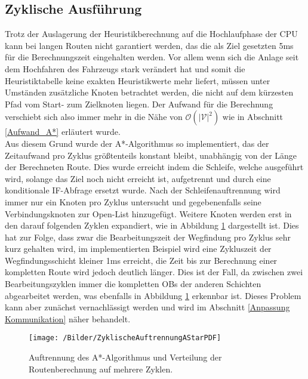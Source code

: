 		\subsection{Zyklische Ausführung}
			\label{zyklische Auftrennung}
			Trotz der Auslagerung der Heuristikberechnung auf die Hochlaufphase der CPU kann bei langen Routen nicht garantiert werden, das die als Ziel gesetzten 5ms für die Berechnungszeit eingehalten werden. Vor allem wenn sich die Anlage seit dem Hochfahren des Fahrzeugs stark verändert hat und somit die Heuristiktabelle keine exakten Heuristikwerte mehr liefert, müssen unter Umständen zusätzliche Knoten betrachtet werden, die nicht auf dem kürzesten Pfad vom Start- zum Zielknoten liegen. Der Aufwand für die Berechnung verschiebt sich also immer mehr in die Nähe von $\mathcal{O}(|\mathcal{V}|^2)$ wie in Abschnitt \ref{Aufwand_A*} erläutert wurde.
			\\[4pt]		
			Aus diesem Grund wurde der A*-Algorithmus so implementiert, das der Zeitaufwand pro Zyklus größtenteils konstant bleibt, unabhängig von der Länge der Berechneten Route. Dies wurde erreicht indem die Schleife, welche ausgeführt wird, solange das Ziel noch nicht erreicht ist, aufgetrennt und durch eine konditionale IF-Abfrage ersetzt wurde. Nach der Schleifenauftrennung wird immer nur ein Knoten pro Zyklus untersucht und gegebenenfalls seine Verbindungsknoten zur Open-List hinzugefügt. Weitere Knoten werden erst in den darauf folgenden Zyklen expandiert, wie in Abbildung \ref{Schleifenaufteilung} dargestellt ist. Dies hat zur Folge, dass zwar die Bearbeitungszeit der Wegfindung pro Zyklus sehr kurz gehalten wird, im implementierten Beispiel wird eine Zykluszeit der Wegfindungsschicht kleiner 1ms erreicht, die Zeit bis zur Berechnung einer kompletten Route wird jedoch deutlich länger. Dies ist der Fall, da zwischen zwei Bearbeitungszyklen immer die kompletten \ac{OB}s der anderen Schichten abgearbeitet werden, was ebenfalls in Abbildung \ref{Schleifenaufteilung} erkennbar ist. Dieses Problem kann aber zunächst vernachlässigt werden und wird im Abschnitt \ref{Anpassung Kommunikation} näher behandelt.
		
			
			\begin{figure}[h]
				\centering
				\texttt{[image: /Bilder/ZyklischeAuftrennungAStarPDF]}
				\vspace{0.2cm}
				\caption{Auftrennung des A*-Algorithmus und Verteilung der Routenberechnung auf mehrere Zyklen.}\label{Schleifenaufteilung}
			\end{figure}
			
